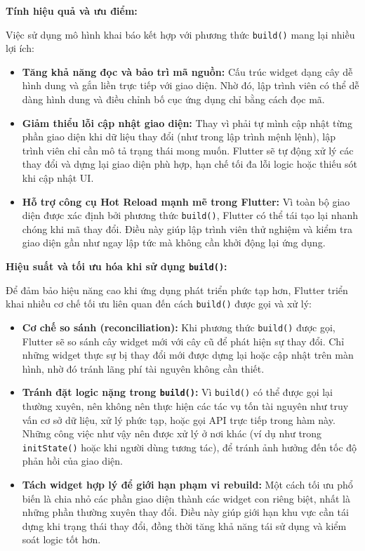 \documentclass[../DoAn.tex]{subfiles}
\numberwithin{figure}{chapter}
\begin{document}
\textbf{Tính hiệu quả và ưu điểm:}

Việc sử dụng mô hình khai báo kết hợp với phương thức \texttt{build()} mang lại nhiều lợi ích:
\begin{itemize}
\item \textbf{Tăng khả năng đọc và bảo trì mã nguồn:} Cấu trúc widget dạng cây dễ hình dung và gắn liền trực tiếp với giao diện. Nhờ đó, lập trình viên có thể dễ dàng hình dung và điều chỉnh bố cục ứng dụng chỉ bằng cách đọc mã.
\item \textbf{Giảm thiểu lỗi cập nhật giao diện:} Thay vì phải tự mình cập nhật từng phần giao diện khi dữ liệu thay đổi (như trong lập trình mệnh lệnh), lập trình viên chỉ cần mô tả trạng thái mong muốn. Flutter sẽ tự động xử lý các thay đổi và dựng lại giao diện phù hợp, hạn chế tối đa lỗi logic hoặc thiếu sót khi cập nhật UI.
\item \textbf{Hỗ trợ công cụ Hot Reload mạnh mẽ trong Flutter:} Vì toàn bộ giao diện được xác định bởi phương thức \texttt{build()}, Flutter có thể tái tạo lại nhanh chóng khi mã thay đổi. Điều này giúp lập trình viên thử nghiệm và kiểm tra giao diện gần như ngay lập tức mà không cần khởi động lại ứng dụng.
\end{itemize}

\textbf{Hiệu suất và tối ưu hóa khi sử dụng \texttt{build()}:}

Để đảm bảo hiệu năng cao khi ứng dụng phát triển phức tạp hơn, Flutter triển khai nhiều cơ chế tối ưu liên quan đến cách \texttt{build()} được gọi và xử lý:
\begin{itemize}
\item \textbf{Cơ chế so sánh (reconciliation):} Khi phương thức \texttt{build()} được gọi, Flutter sẽ so sánh cây widget mới với cây cũ để phát hiện sự thay đổi. Chỉ những widget thực sự bị thay đổi mới được dựng lại hoặc cập nhật trên màn hình, nhờ đó tránh lãng phí tài nguyên không cần thiết. 
\item \textbf{Tránh đặt logic nặng trong \texttt{build()}:} Vì \texttt{build()} có thể được gọi lại thường xuyên, nên không nên thực hiện các tác vụ tốn tài nguyên như truy vấn cơ sở dữ liệu, xử lý phức tạp, hoặc gọi API trực tiếp trong hàm này. Những công việc như vậy nên được xử lý ở nơi khác (ví dụ như trong \texttt{initState()} hoặc khi người dùng tương tác), để tránh ảnh hưởng đến tốc độ phản hồi của giao diện.
\item \textbf{Tách widget hợp lý để giới hạn phạm vi rebuild:} Một cách tối ưu phổ biến là chia nhỏ các phần giao diện thành các widget con riêng biệt, nhất là những phần thường xuyên thay đổi. Điều này giúp giới hạn khu vực cần tái dựng khi trạng thái thay đổi, đồng thời tăng khả năng tái sử dụng và kiểm soát logic tốt hơn.
\end{itemize}
\end{document}
